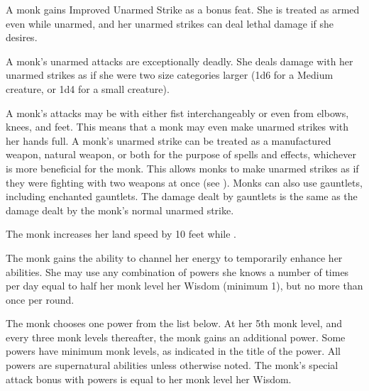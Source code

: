  A monk gains Improved Unarmed Strike as a bonus feat. She is treated as armed even while unarmed, and her unarmed strikes can deal lethal damage if she desires.

 A monk's unarmed attacks are exceptionally deadly. She deals damage with her unarmed strikes as if she were two size categories larger (1d6 for a Medium creature, or 1d4 for a small creature).

A monk's attacks may be with either fist interchangeably or even from elbows, knees, and feet. This means that a monk may even make unarmed strikes with her hands full. A monk's unarmed strike can be treated as a manufactured weapon, natural weapon, or both for the purpose of spells and effects, whichever is more beneficial for the monk. This allows monks to make unarmed strikes as if they were fighting with two weapons at once (see ). Monks can also use gauntlets, including enchanted gauntlets. The damage dealt by gauntlets is the same as the damage dealt by the monk's normal unarmed strike.

 The monk increases her land speed by 10 feet while \unencumbered.

 The monk gains the ability to channel her \ki energy to temporarily enhance her abilities. She may use any combination of \ki powers she knows a number of times per day equal to half her monk level \add her Wisdom (minimum 1), but no more than once per round.

The monk chooses one \ki power from the list below. At her 5th monk level, and every three monk levels thereafter, the monk gains an additional \ki power. Some \ki powers have minimum monk levels, as indicated in the title of the power. All \ki powers are supernatural abilities unless otherwise noted. The monk's special attack bonus with \ki powers is equal to her monk level \add her Wisdom.

